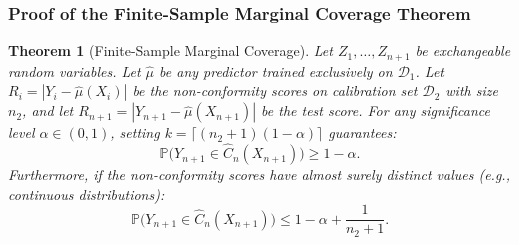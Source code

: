\documentclass[journal]{IEEEtran}
\newtheorem{theorem}{Theorem}
\begin{document}
\subsubsection{Proof of the Finite-Sample Marginal Coverage Theorem}

\begin{theorem}[Finite-Sample Marginal Coverage]\label{thm:coverage}
Let $Z_1, \dots, Z_{n+1}$ be exchangeable random variables. Let $\hat{\mu}$ be any predictor trained exclusively on $\mathcal{D}_1$. Let $R_i = |Y_i - \hat{\mu}(X_i)|$ be the non-conformity scores on calibration set $\mathcal{D}_2$ with size $n_2$, and let $R_{n+1} = |Y_{n+1} - \hat{\mu}(X_{n+1})|$ be the test score. For any significance level $\alpha \in (0, 1)$, setting $k = \lceil (n_2 + 1)(1 - \alpha) \rceil$ guarantees:
\begin{equation}
\mathbb{P}\big(Y_{n+1} \in \hat{C}_n(X_{n+1})\big) \ge 1 - \alpha.
\end{equation}
Furthermore, if the non-conformity scores have almost surely distinct values (e.g., continuous distributions):
\begin{equation}
\mathbb{P}\big(Y_{n+1} \in \hat{C}_n(X_{n+1})\big) \le 1 - \alpha + \frac{1}{n_2 + 1}.
\end{equation}
\end{theorem}
\end{document}
